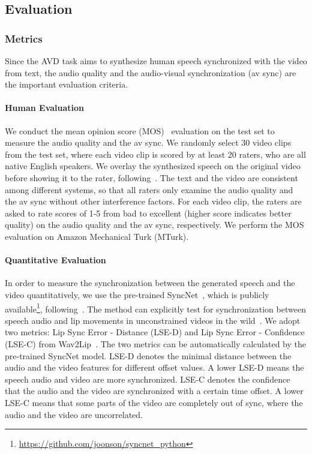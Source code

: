 \documentclass{article}
\begin{document}
\subsection{Evaluation}
\subsubsection{Metrics}
Since the AVD task aims to synthesize human speech synchronized with the video from text, the audio quality and the audio-visual synchronization (av sync) are the important evaluation criteria. 

\paragraph{Human Evaluation}
We conduct the mean opinion score (MOS)~\cite{chu2006objective} evaluation on the test set to measure the audio quality and the av sync. We randomly select 30 video clips from the test set, where each video clip is scored by at least 20 raters, who are all native English speakers. We overlay the synthesized speech on the original video before showing it to the rater, following~\cite{prajwal2020learning}. The text and the video are consistent among different systems, so that all raters only examine the audio quality and the av sync without other interference factors. For each video clip, the raters are asked to rate scores of 1-5 from bad to excellent (higher score indicates better quality) on the audio quality and the av sync, respectively. We perform the MOS evaluation on Amazon Mechanical Turk (MTurk). 

\paragraph{Quantitative Evaluation}
In order to measure the synchronization between the generated speech and the video quantitatively, we use the pre-trained SyncNet~\cite{chung2016out}, which is publicly available\footnote{\url{https://github.com/joonson/syncnet_python}}, following~\cite{prajwal2020learning}. The method can explicitly test for synchronization between speech audio and lip movements in unconstrained videos in the wild~\cite{chung2016out, prajwal2020lip}. We adopt two metrics: Lip Sync Error - Distance (LSE-D) and Lip Sync Error - Confidence (LSE-C) from Wav2Lip~\cite{prajwal2020lip}. The two metrics can be automatically calculated by the pre-trained SyncNet model. LSE-D denotes the minimal distance between the audio and the video features for different offset values. A lower LSE-D means the speech audio and video are more synchronized. LSE-C denotes the confidence that the audio and the video are synchronized with a certain time offset. A lower LSE-C means that some parts of the video are completely out of sync, where the audio and the video are uncorrelated. 
\end{document}
